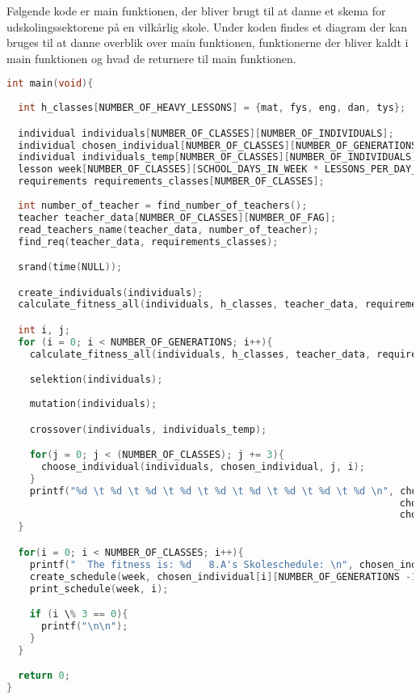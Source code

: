 Følgende kode er main funktionen, der bliver brugt til at danne et skema for udskolingssektorene på en vilkårlig skole. Under koden findes et diagram der kan bruges til at danne overblik over main funktionen, funktionerne der bliver kaldt i main funktionen og hvad de returnere til main funktionen. 
\begin{lstlisting}[showstringspaces=false,language = c]
int main(void){
  
  int h_classes[NUMBER_OF_HEAVY_LESSONS] = {mat, fys, eng, dan, tys};

  individual individuals[NUMBER_OF_CLASSES][NUMBER_OF_INDIVIDUALS];
  individual chosen_individual[NUMBER_OF_CLASSES][NUMBER_OF_GENERATIONS];
  individual individuals_temp[NUMBER_OF_CLASSES][NUMBER_OF_INDIVIDUALS];
  lesson week[NUMBER_OF_CLASSES][SCHOOL_DAYS_IN_WEEK * LESSONS_PER_DAY_MAX];
  requirements requirements_classes[NUMBER_OF_CLASSES];
  
  int number_of_teacher = find_number_of_teachers();
  teacher teacher_data[NUMBER_OF_CLASSES][NUMBER_OF_FAG];
  read_teachers_name(teacher_data, number_of_teacher);
  find_req(teacher_data, requirements_classes);

  srand(time(NULL));

  create_individuals(individuals);
  calculate_fitness_all(individuals, h_classes, teacher_data, requirements_classes);

  int i, j;
  for (i = 0; i < NUMBER_OF_GENERATIONS; i++){
    calculate_fitness_all(individuals, h_classes, teacher_data, requirements_classes);

    selektion(individuals);
    
    mutation(individuals);

    crossover(individuals, individuals_temp);

    for(j = 0; j < (NUMBER_OF_CLASSES); j += 3){
      choose_individual(individuals, chosen_individual, j, i);  
    }
    printf("%d \t %d \t %d \t %d \t %d \t %d \t %d \t %d \t %d \n", chosen_individual[0][i].fitness, chosen_individual[1][i].fitness, chosen_individual[2][i].fitness, 
                                                                    chosen_individual[3][i].fitness, chosen_individual[4][i].fitness, chosen_individual[5][i].fitness, 
                                                                    chosen_individual[6][i].fitness, chosen_individual[7][i].fitness, chosen_individual[8][i].fitness);
  }

  for(i = 0; i < NUMBER_OF_CLASSES; i++){
    printf("  The fitness is: %d   8.A's Skoleschedule: \n", chosen_individual[i][NUMBER_OF_GENERATIONS -1].fitness);
    create_schedule(week, chosen_individual[i][NUMBER_OF_GENERATIONS -1], i);
    print_schedule(week, i);

    if (i \% 3 == 0){
      printf("\n\n");
    }
  }

  return 0;
}
\end{lstlisting}

